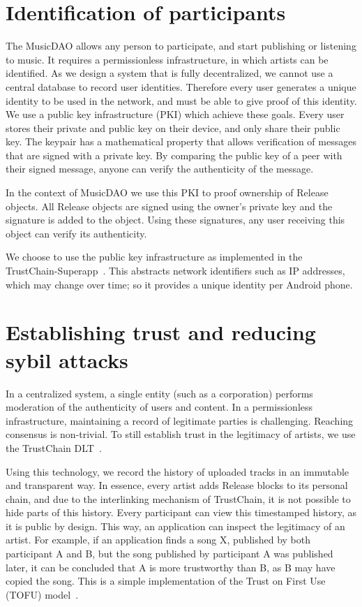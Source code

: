 \section{Identification of participants}
\label{sec:pki-design}
The MusicDAO allows any person to participate, and start publishing or listening to music. It requires a permissionless infrastructure, in which artists can be identified. As we design a system that is fully decentralized, we cannot use a central database to record user identities. Therefore every user generates a unique identity to be used in the network, and must be able to give proof of this identity. We use a public key infrastructure (PKI) which achieve these goals. Every user stores their private and public key on their device, and only share their public key. The keypair has a mathematical property that allows verification of messages that are signed with a private key. By comparing the public key of a peer with their signed message, anyone can verify the authenticity of the message.

In the context of MusicDAO we use this PKI to proof ownership of Release objects. All Release objects are signed using the owner's private key and the signature is added to the object. Using these signatures, any user receiving this object can verify its authenticity.

We choose to use the public key infrastructure as implemented in the TrustChain-Superapp~\citep{mattskala2020}. This abstracts network identifiers such as IP addresses, which may change over time; so it provides a unique identity per Android phone.

\section{Establishing trust and reducing sybil attacks}
In a centralized system, a single entity (such as a corporation) performs moderation of the authenticity of users and content. In a permissionless infrastructure, maintaining a record of legitimate parties is challenging. Reaching consensus is non-trivial. To still establish trust in the legitimacy of artists, we use the TrustChain DLT~\citep{otte2017trustchain}.

Using this technology, we record the history of uploaded tracks in an immutable and transparent way. In essence, every artist adds Release blocks to its personal chain, and due to the interlinking mechanism of TrustChain, it is not possible to hide parts of this history. Every participant can view this timestamped history, as it is public by design. This way, an application can inspect the legitimacy of an artist. For example, if an application finds a song X, published by both participant A and B, but the song published by participant A was published later, it can be concluded that A is more trustworthy than B, as B may have copied the song. This is a simple implementation of the Trust on First Use (TOFU) model~\citep{toth2013public}.

